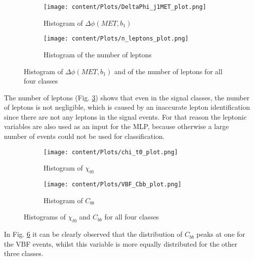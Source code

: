 \begin{figure}[htbp]
    \centering
    \begin{subfigure}{0.45\textwidth}
        \centering
        \texttt{[image: content/Plots/DeltaPhi\_j1MET\_plot.png]}
        \caption{Histogram of $\Delta \phi (MET, b_1)$}
        \label{fig:roc1}
    \end{subfigure}
    \hfill
    \begin{subfigure}{0.45\textwidth}
        \centering
        \texttt{[image: content/Plots/n\_leptons\_plot.png]}
        \caption{Histogram of the number of leptons}
        \label{fig:roc2}
    \end{subfigure}
    \caption{Histogram of $\Delta \phi (MET, b_1)$ and of the number of leptons for all four classes}
    \label{fig:21}
\end{figure}

The number of leptons (Fig. \ref{fig:21}) shows that even in the signal classes, the number of leptons is not negligible, which is caused by an inaccurate lepton identification since
there are not any leptons in the signal events. For that reason the leptonic variables are also used as an input for the MLP, because otherwise a large number of events could not be used for classification.

\begin{figure}[!t]
    \centering
    \begin{subfigure}{0.45\textwidth}
        \centering
        \texttt{[image: content/Plots/chi\_t0\_plot.png]}
        \caption{Histogram of $\chi_{t0}$}
        \label{fig:roc1}
    \end{subfigure}
    \hfill
    \begin{subfigure}{0.45\textwidth}
        \centering
        \texttt{[image: content/Plots/VBF\_Cbb\_plot.png]}
        \caption{Histogram of $C_{bb}$}
        \label{fig:roc2}
    \end{subfigure}
    \caption{Histograms of $\chi_{t0}$ and $C_{bb}$ for all four classes}
    \label{fig:22}
\end{figure}

In Fig. \ref{fig:22} it can be clearly observed that the distribution of $C_{bb}$ peaks at one for the VBF events, whilst this variable is more equally distributed for the other three classes.